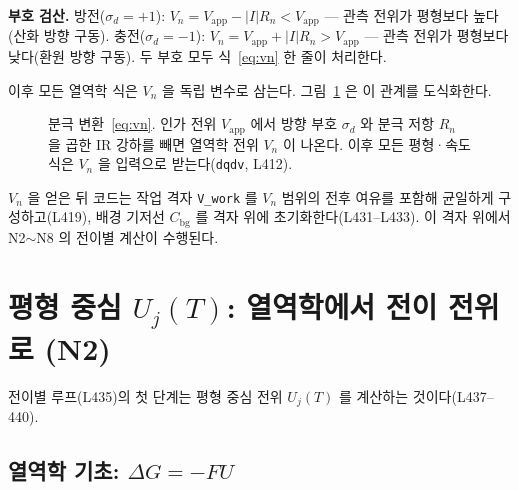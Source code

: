 \documentclass[11pt,a4paper]{article}
\newcommand{\app}{\mathrm{app}}
\newcommand{\bg}{\mathrm{bg}}
\begin{document}
\textbf{부호 검산.} 방전($\sigma_d=+1$): $V_n = V_\app - |I|R_n < V_\app$ — 관측
전위가 평형보다 높다(산화 방향 구동). 충전($\sigma_d=-1$): $V_n = V_\app + |I|R_n
> V_\app$ — 관측 전위가 평형보다 낮다(환원 방향 구동). 두 부호 모두 식~\eqref{eq:vn}
한 줄이 처리한다.

이후 모든 열역학 식은 $V_n$ 을 독립 변수로 삼는다. 그림~\ref{fig:polar} 은 이 관계를
도식화한다.

\begin{figure}[t]
\centering
{}
\caption{분극 변환~\eqref{eq:vn}. 인가 전위 $V_\app$ 에서 방향 부호 $\sigma_d$ 와 분극
저항 $R_n$ 을 곱한 IR 강하를 빼면 열역학 전위 $V_n$ 이 나온다. 이후 모든 평형·속도식은
$V_n$ 을 입력으로 받는다(\texttt{dqdv}, L412).}
\label{fig:polar}
\end{figure}

$V_n$ 을 얻은 뒤 코드는 작업 격자 \texttt{V\_work} 를 $V_n$ 범위의 전후 여유를 포함해
균일하게 구성하고(L419), 배경 기저선 $C_\bg$ 를 격자 위에 초기화한다(L431--L433).
이 격자 위에서 N2$\sim$N8 의 전이별 계산이 수행된다.

\section{평형 중심 $U_j(T)$: 열역학에서 전이 전위로 (N2)}\label{sec:Uj}

전이별 루프(L435)의 첫 단계는 평형 중심 전위 $U_j(T)$ 를 계산하는 것이다(L437--440).

\subsection{열역학 기초: $\Delta G = -FU$}
\end{document}
